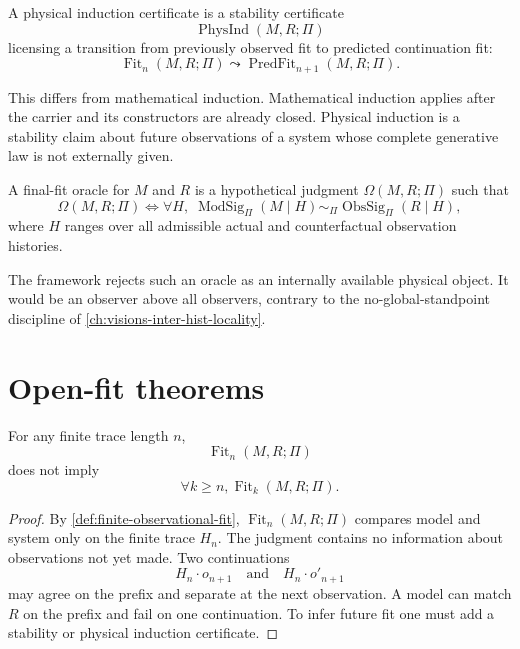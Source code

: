 \begin{definition}
\label{def:physical-induction-certificate}
A physical induction certificate is a stability certificate
$$
\operatorname{PhysInd}(M,R;\Pi)
$$
licensing a transition from previously observed fit to predicted continuation fit:
$$
\operatorname{Fit}_n(M,R;\Pi)
\leadsto
\operatorname{PredFit}_{n+1}(M,R;\Pi).
$$
\end{definition}

This differs from mathematical induction. Mathematical induction applies after the carrier and its constructors are already closed. Physical induction is a stability claim about future observations of a system whose complete generative law is not externally given.

\begin{definition}
\label{def:final-fit-oracle}
A final-fit oracle for $M$ and $R$ is a hypothetical judgment $\Omega(M,R;\Pi)$ such that
$$
\Omega(M,R;\Pi)
\Longleftrightarrow
\forall H,\;
\operatorname{ModSig}_{\Pi}(M\mid H)
\sim_{\Pi}
\operatorname{ObsSig}_{\Pi}(R\mid H),
$$
where $H$ ranges over all admissible actual and counterfactual observation histories.
\end{definition}

The framework rejects such an oracle as an internally available physical object. It would be an observer above all observers, contrary to the no-global-standpoint discipline of \autoref{ch:visions-inter-hist-locality}.

\section{Open-fit theorems}
\label{sec:open-fit-theorems}

\begin{theorem}
\label{thm:finite-fit-does-not-imply-total-fit}
For any finite trace length $n$,
$$
\operatorname{Fit}_n(M,R;\Pi)
$$
does not imply
$$
\forall k\geq n,\operatorname{Fit}_k(M,R;\Pi).
$$
\end{theorem}

\begin{proof}
By \autoref{def:finite-observational-fit}, $\operatorname{Fit}_n(M,R;\Pi)$ compares model and system only on the finite trace $H_n$. The judgment contains no information about observations not yet made. Two continuations
$$
H_n\cdot o_{n+1}
\quad\text{and}\quad
H_n\cdot o'_{n+1}
$$
may agree on the prefix and separate at the next observation. A model can match $R$ on the prefix and fail on one continuation. To infer future fit one must add a stability or physical induction certificate.
\end{proof}

